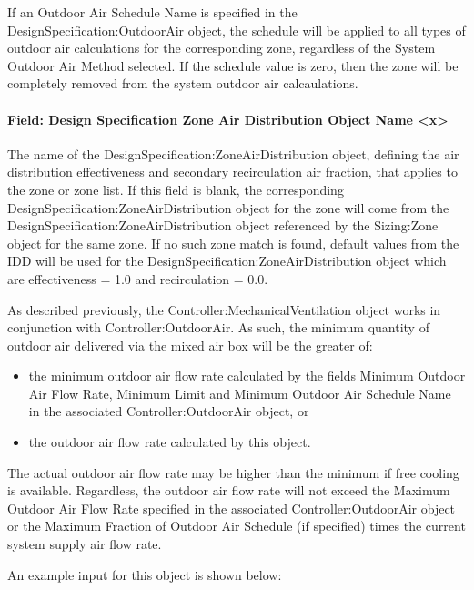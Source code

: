 If an Outdoor Air Schedule Name is specified in the DesignSpecification:OutdoorAir object, the schedule will be applied to all types of outdoor air calculations for the corresponding zone, regardless of the System Outdoor Air Method selected. If the schedule value is zero, then the zone will be completely removed from the system outdoor air calcaulations.

\paragraph{Field: Design Specification Zone Air Distribution Object Name \textless{}x\textgreater{}}\label{field-design-specification-zone-air-distribution-object-name-x}

The name of the DesignSpecification:ZoneAirDistribution object, defining the air distribution effectiveness and secondary recirculation air fraction, that applies to the zone or zone list. If this field is blank, the corresponding DesignSpecification:ZoneAirDistribution object for the zone will come from the DesignSpecification:ZoneAirDistribution object referenced by the Sizing:Zone object for the same zone. If no such zone match is found, default values from the IDD will be used for the DesignSpecification:ZoneAirDistribution object which are effectiveness = 1.0 and recirculation = 0.0.

As described previously, the Controller:MechanicalVentilation object works in conjunction with Controller:OutdoorAir. As such, the minimum quantity of outdoor air delivered via the mixed air box will be the greater of:

\begin{itemize}
\item
  the minimum outdoor air flow rate calculated by the fields Minimum Outdoor Air Flow Rate, Minimum Limit and Minimum Outdoor Air Schedule Name in the associated Controller:OutdoorAir object, or
\item
  the outdoor air flow rate calculated by this object.
\end{itemize}

The actual outdoor air flow rate may be higher than the minimum if free cooling is available. Regardless, the outdoor air flow rate will not exceed the Maximum Outdoor Air Flow Rate specified in the associated Controller:OutdoorAir object or the Maximum Fraction of Outdoor Air Schedule (if specified) times the current system supply air flow rate.

An example input for this object is shown below:

